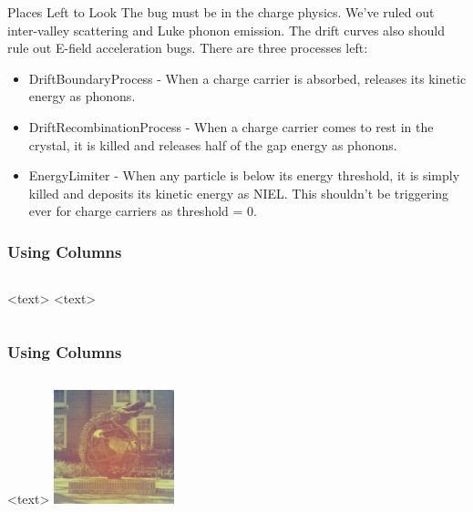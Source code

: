 \documentclass{beamer}
\begin{document}
\begin{frame}{Places Left to Look}
    \vfill
    The bug must be in the charge physics. We've ruled out inter-valley scattering
    and Luke phonon emission. The drift curves also should rule out E-field
    acceleration bugs. There are three processes left:
    \begin{itemize}
        \item DriftBoundaryProcess - When a charge carrier is absorbed, releases
            its kinetic energy as phonons.
        \item DriftRecombinationProcess - When a charge carrier comes to rest
            in the crystal, it is killed and releases half of the gap energy
            as phonons.
        \item EnergyLimiter - When any particle is below its energy threshold,
            it is simply killed and deposits its kinetic energy as NIEL. This
            shouldn't be triggering ever for charge carriers as threshold = 0.
    \end{itemize}
    \vfill
\end{frame}


\begin{frame}
\frametitle{Using Columns}
\begin{columns}
<text>
<text>
\end{columns}
\end{frame}


\begin{frame}
\frametitle{Using Columns}
\begin{columns}
<text>
\centering 
\includegraphics[width=3.5cm]{gator.png}
\end{columns}
\end{frame}
\end{document}
